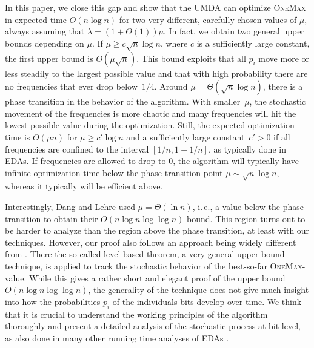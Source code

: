 \documentclass[11pt, a4paper]{article}
\newcommand*{\om}{\textsc{OneMax}\xspace}
\newcommand{\umda}{UMDA\xspace}
\newcommand{\ie}{i.\,e.\xspace}
\begin{document}
In this paper, we close this gap and show that the \umda can optimize \om in expected time $O(n\log n)$ 
for two very different, carefully chosen values of $\mu$, always assuming that
 $\lambda=(1+\Theta(1))\mu$. In fact, we obtain two general upper bounds depending on 
$\mu$. If $\mu\ge c\sqrt{n}\log n$, 
where $c$ is a sufficiently large constant, the first upper bound is $O(\mu\sqrt{n})$. This 
bound exploits that all $p_i$ move more or less steadily to the largest possible value  and that 
with high probability there are no frequencies that ever drop below~$1/4$. Around $\mu=\Theta(\sqrt{n}\log n)$, 
there is a phase transition in the behavior of the algorithm. With smaller~$\mu$, the stochastic movement of the 
frequencies is more chaotic and many frequencies will hit the lowest possible value during the 
optimization. Still, the expected optimization time is $O(\mu n)$ for $\mu\ge c'\log n$ and  
a sufficiently large constant~$c'>0$ if all 
frequencies are confined to the interval $[1/n,1-1/n]$, 
as typically done in EDAs. If frequencies are allowed to drop to $0$, the algorithm will typically have
infinite optimization time below the phase transition point $\mu\sim\sqrt{n}\log n$, whereas 
it typically will be efficient above.

Interestingly, Dang and Lehre \cite{DangLehreGECCO15} used $\mu=\Theta(\ln n)$, \ie, a value below the
phase transition  to obtain their $ O(n\log n\log\log n)$ bound. This region turns out to 
be harder to analyze than the region above the phase transition, at least with our techniques. 
However, our proof also follows an approach being widely different from \cite{DangLehreGECCO15}. 
There the so-called level based theorem, a very general upper bound technique, is applied 
to track the stochastic behavior of the best-so-far \om-value. While this gives a rather short and elegant 
proof of the upper bound $ O(n\log n\log\log n)$, the generality of the technique does not give much insight into 
how the probabilities $p_i$ of the individuals bits develop over time. We think that it is crucial to understand
 the working principles of the algorithm thoroughly and present a detailed analysis of the stochastic process 
at bit level, as also done in many other running time 
analyses of EDAs \cite{FriedrichKK16EDA, FriedrichEtAlISAAC15,SudholtWitt2016,KrejcaWittFOGA2017}.
\end{document}

